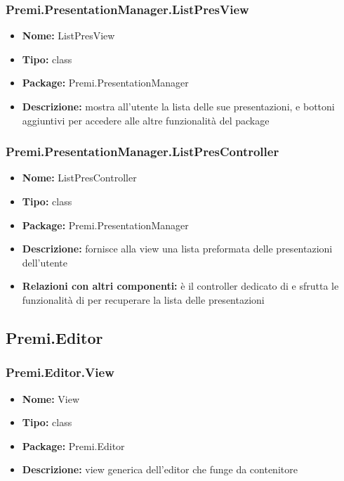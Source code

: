 \subsubsection{Premi.PresentationManager.ListPresView}
\begin{itemize}
  \item \textbf{Nome:} ListPresView
  \item \textbf{Tipo:} class
  \item \textbf{Package:} Premi.PresentationManager
  \item \textbf{Descrizione:} mostra all'utente la lista delle sue presentazioni, e bottoni aggiuntivi per accedere alle altre funzionalità del package
\end{itemize}
\subsubsection{Premi.PresentationManager.ListPresController}
\begin{itemize}
  \item \textbf{Nome:} ListPresController
  \item \textbf{Tipo:} class
  \item \textbf{Package:} Premi.PresentationManager
  \item \textbf{Descrizione:} fornisce alla view una lista preformata delle presentazioni dell'utente
  \item \textbf{Relazioni con altri componenti:} è il controller dedicato di   e sfrutta le funzionalità di  per recuperare la lista delle presentazioni
\end{itemize}
\subsection{Premi.Editor}
\subsubsection{Premi.Editor.View}
\begin{itemize}
  \item \textbf{Nome:} View
  \item \textbf{Tipo:} class
  \item \textbf{Package:} Premi.Editor
  \item \textbf{Descrizione:} view generica dell'editor che funge da contenitore
\end{itemize}

